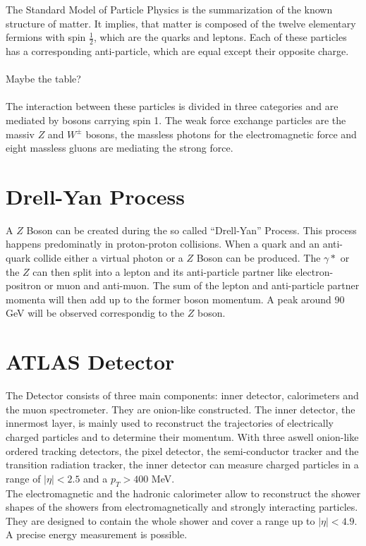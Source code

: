 \documentclass[12pt, a4paper, bibliography=totoc]{scrreprt}
\begin{document}
The Standard Model of Particle Physics is the summarization of the known structure of matter.
It implies, that matter is composed of the twelve elementary fermions with spin $\frac{1}{2}$, which are the quarks and leptons. Each of these particles has a corresponding anti-particle, which are equal except their opposite charge.
\\
\\
Maybe the table?
\\
\\
The interaction between these particles is divided in three categories and are mediated by bosons carrying spin 1. The weak force exchange particles are the massiv $Z$ and $W^{\pm}$ bosons, the massless photons for the electromagnetic force and eight massless gluons are mediating the strong force. 
 
\section{Drell-Yan Process}
A $Z$ Boson can be created during the so called ``Drell-Yan'' Process. This process happens predominatly in proton-proton collisions.
When a quark and an anti-quark collide either a virtual photon or a $Z$ Boson can be produced. 
The $\gamma*$ or the $Z$ can then split into a lepton and its anti-particle partner like electron-positron or muon and anti-muon.
The sum of the lepton and anti-particle partner momenta will then add up to the former boson momentum. A peak around 90 GeV will be observed correspondig to the $Z$ boson. 

\section{ATLAS Detector}
The Detector consists of three main components: inner detector, calorimeters and the muon spectrometer. They are onion-like constructed. 
The inner detector, the innermost layer, is mainly used to reconstruct the trajectories of electrically charged particles and to determine their momentum. With three aswell onion-like ordered tracking detectors, the pixel detector, the semi-conductor tracker and the transition radiation tracker, the inner detector can measure charged particles in a range of $|\eta| < 2.5$ and a $p_{T} > 400$ MeV.\\

The electromagnetic and the hadronic calorimeter allow to reconstruct the shower shapes of the showers from electromagnetically and strongly interacting particles. They are designed to contain the whole shower and cover a range up to $|\eta| < 4.9$. A precise energy measurement is possible.\\
\end{document}

